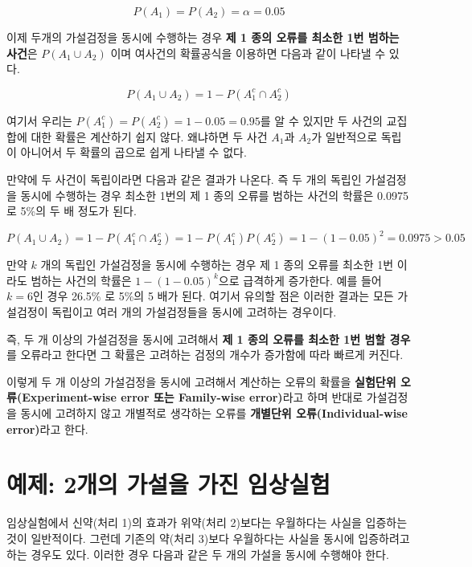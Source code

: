 \documentclass[
]{book}
\begin{document}
\[ P( A_1 ) =  P(A_2) = \alpha =0.05 \]

이제 두개의 가설검정을 동시에 수행하는 경우 \textbf{제 1 종의 오류를 최소한
1번 범하는 사건}은 \(P(A_1 \cup A_2)\) 이며 여사건의 확률공식을 이용하면
다음과 같이 나타낼 수 있다.

\[ P( A_1 \cup A_2 ) = 1- P(A_1^c \cap A^c_2 ) \]

여기서 우리는 \(P(A_1^c)=P(A_2^c)=1-0.05=0.95\)를 알 수 있지만 두 사건의
교집합에 대한 확률은 계산하기 쉽지 않다. 왜냐하면 두 사건 \(A_1\)과
\(A_2\)가 일반적으로 독립이 아니어서 두 확률의 곱으로 쉽게 나타낼 수 없다.

만약에 두 사건이 독립이라면 다음과 같은 결과가 나온다. 즉 두 개의 독립인
가설검정을 동시에 수행하는 경우 최소한 1번의 제 1 종의 오류를 범하는
사건의 학률은 0.0975로 5\%의 두 배 정도가 된다.

\[ P( A_1 \cup A_2 ) = 1- P(A_1^c \cap A^c_2 ) =1-P(A_1^c)P(A^c_2 ) = 1-(1-0.05)^2 = 0.0975 > 0.05 \]

만약 \(k\) 개의 독립인 가설검정을 동시에 수행하는 경우 제 1 종의 오류를
최소한 1번 이라도 범하는 사건의 학률은 \(1-(1-0.05)^k\)으로 급격하게
증가한다. 예를 들어 \(k=6\)인 경우 26.5\% 로 5\%의 5 배가 된다. 여기서
유의할 점은 이러한 결과는 모든 가설검정이 독립이고 여러 개의
가설검정들을 동시에 고려하는 경우이다.

즉, 두 개 이상의 가설검정을 동시에 고려해서 \textbf{제 1 종의 오류를 최소한
1번 범할 경우}를 오류라고 한다면 그 확률은 고려하는 검정의 개수가
증가함에 따라 빠르게 커진다.

이렇게 두 개 이상의 가설검정을 동시에 고려해서 계산하는 오류의 확률을
\textbf{실험단위 오류(Experiment-wise error 또는 Family-wise error)}라고 하며 반대로 가설검정을
동시에 고려하지 않고 개별적로 생각하는 오류를 \textbf{개별단위 오류(Individual-wise error)}라고 한다.

\hypertarget{uxc608uxc81c-2uxac1cuxc758-uxac00uxc124uxc744-uxac00uxc9c4-uxc784uxc0c1uxc2e4uxd5d8}{%
\section{예제: 2개의 가설을 가진 임상실험}\label{uxc608uxc81c-2uxac1cuxc758-uxac00uxc124uxc744-uxac00uxc9c4-uxc784uxc0c1uxc2e4uxd5d8}}

임상실험에서 신약(처리 1)의 효과가 위약(처리 2)보다는 우월하다는 사실을
입증하는 것이 일반적이다. 그런데 기존의 약(처리 3)보다 우월하다는 사실을
동시에 입증하려고 하는 경우도 있다. 이러한 경우 다음과 같은 두 개의
가설을 동시에 수행해야 한다.
\end{document}

